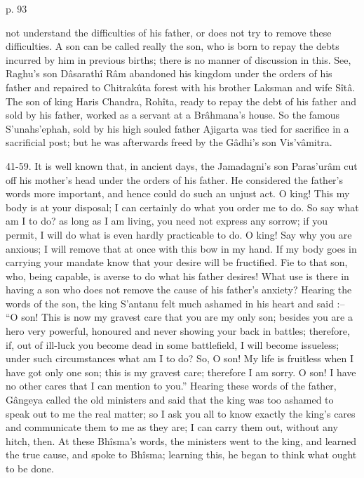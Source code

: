  

p. 93

 

not understand the difficulties of his father, or does not try to remove these difficulties. A son can be called really the son, who is born to repay the debts incurred by him in previous births; there is no manner of discussion in this. See, Raghu's son Dâsarathî Râm abandoned his kingdom under the orders of his father and repaired to Chitrakûta forest with his brother Laksman and wife Sîtâ. The son of king Haris Chandra, Rohîta, ready to repay the debt of his father and sold by his father, worked as a servant at a Brâhmana's house. So the famous S’unahs'ephah, sold by his high souled father Ajigarta was tied for sacrifice in a sacrificial post; but he was afterwards freed by the Gâdhi's son Vis'vâmitra.

 

41-59. It is well known that, in ancient days, the Jamadagni's son Paras'urâm cut off his mother's head under the orders of his father. He considered the father's words more important, and hence could do such an unjust act. O king! This my body is at your disposal; I can certainly do what you order me to do. So say what am I to do? as long as I am living, you need not express any sorrow; if you permit, I will do what is even hardly practicable to do. O king! Say why you are anxious; I will remove that at once with this bow in my hand. If my body goes in carrying your mandate know that your desire will be fructified. Fie to that son, who, being capable, is averse to do what his father desires! What use is there in having a son who does not remove the cause of his father's anxiety? Hearing the words of the son, the king S’antanu felt much ashamed in his heart and said :-- “O son! This is now my gravest care that you are my only son; besides you are a hero very powerful, honoured and never showing your back in battles; therefore, if, out of ill-luck you become dead in some battlefield, I will become issueless; under such circumstances what am I to do? So, O son! My life is fruitless when I have got only one son; this is my gravest care; therefore I am sorry. O son! I have no other cares that I can mention to you.” Hearing these words of the father, Gângeya called the old ministers and said that the king was too ashamed to speak out to me the real matter; so I ask you all to know exactly the king's cares and communicate them to me as they are; I can carry them out, without any hitch, then. At these Bhîsma's words, the ministers went to the king, and learned the true cause, and spoke to Bhîsma; learning this, he began to think what ought to be done.

